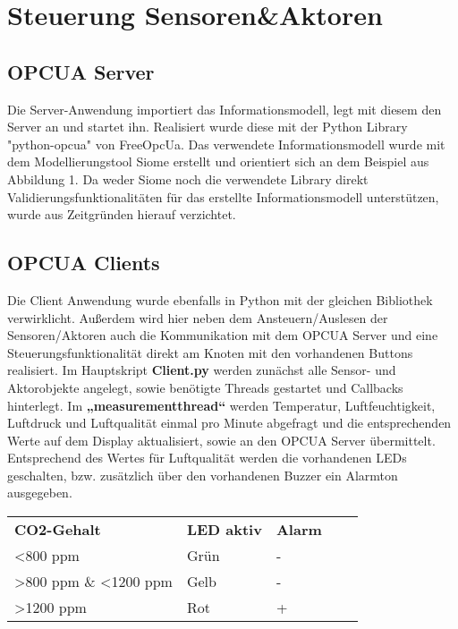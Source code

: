 \section{Steuerung Sensoren\&Aktoren}\label{ch:sensoren_kommunikation}

\subsection{OPCUA Server}
Die Server-Anwendung importiert das Informationsmodell, legt mit diesem den Server an und startet ihn. Realisiert wurde diese mit der Python Library "python-opcua" von FreeOpcUa. Das verwendete Informationsmodell wurde mit dem Modellierungstool Siome erstellt und orientiert sich an dem Beispiel aus Abbildung 1. Da weder Siome noch die verwendete Library direkt Validierungsfunktionalitäten für das erstellte Informationsmodell unterstützen, wurde aus Zeitgründen hierauf verzichtet.

\subsection{OPCUA Clients}
Die Client Anwendung wurde ebenfalls in Python mit der gleichen Bibliothek verwirklicht. Außerdem wird hier neben dem Ansteuern/Auslesen der Sensoren/Aktoren auch die Kommunikation mit dem OPCUA Server und eine Steuerungsfunktionalität direkt am Knoten mit den vorhandenen Buttons realisiert. 
\newline Im Hauptskript \textbf{Client.py} werden zunächst alle Sensor- und Aktorobjekte angelegt, sowie benötigte Threads gestartet und Callbacks hinterlegt. 
\newline Im \textbf{„measurement\textunderscore thread“} werden Temperatur, Luftfeuchtigkeit, Luftdruck und Luftqualität einmal pro Minute abgefragt und die entsprechenden Werte auf dem Display aktualisiert, sowie an den OPCUA Server übermittelt. Entsprechend des Wertes für Luftqualität werden die vorhandenen LEDs geschalten, bzw. zusätzlich über den vorhandenen Buzzer ein Alarmton ausgegeben.

\begin{table}
\centering
\begin{tabular}{|l|l|l|ll}
\cline{1-3}
\textbf{CO2-Gehalt}                        & \textbf{LED aktiv} & \textbf{Alarm} &  &  \\ \cline{1-3}
\textless 800 ppm                          & Grün               & -              &  &  \\ \cline{1-3}
\textgreater 800 ppm \& \textless 1200 ppm & Gelb               & -              &  &  \\ \cline{1-3}
\textgreater 1200 ppm                      & Rot                & +              &  &  \\ \cline{1-3}
\end{tabular}
\end{table}

